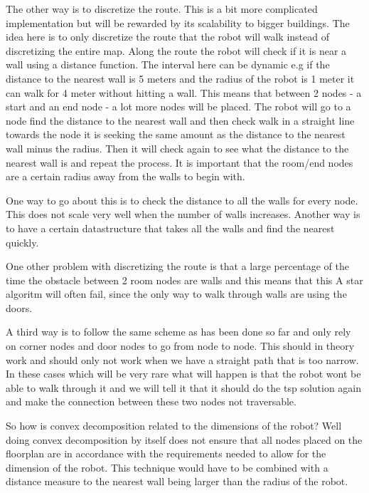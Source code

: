 The other way is to discretize the route. This is a bit more complicated implementation but will be rewarded by its scalability to bigger buildings. 
The idea here is to only discretize the route that the robot will walk instead of discretizing the entire map. 
Along the route  the robot will check if it is near a wall using a distance function. The interval here can be dynamic e.g if the distance to the nearest wall is 5 meters and the radius of the robot is 1 meter it can walk for 4 meter without hitting a wall.
This means that between 2 nodes - a start and an end node - a lot more nodes will be placed. The robot will go to a node find the distance to the nearest wall and then check walk in a straight line towards the node it is seeking the same amount as the distance to the nearest wall minus the radius. Then it will check again to see what the distance to the nearest wall is and repeat the process. It is important that the room/end nodes are a certain radius away from the walls to begin with. 

One way to go about this is to check the distance to all the walls for every node. This does not scale very well when the number of walls increases. 
Another way is to have a certain datastructure that takes all the walls and find the nearest quickly.

One other problem with discretizing the route is that a large percentage of the time the obstacle between 2 room nodes are walls and this means that this A star algoritm will often fail, since the only way to walk through walls are using the doors. 

A third way is to follow the same scheme as has been done so far and only rely on corner nodes and door nodes to go from node to node. This should in theory work and should only not work when we have a straight path that is too narrow. In these cases which will be very rare what will happen is that the robot wont be able to walk through it and we will tell it that it should do the tsp solution again and make the connection between these two nodes not traversable.



So how is convex decomposition related to the dimensions of the robot? Well doing convex decomposition by itself does not ensure that all nodes placed on the floorplan are in accordance with the requirements needed to allow for the dimension of the robot. This technique would have to be combined with a distance measure to the nearest wall being larger than the radius of the robot.


